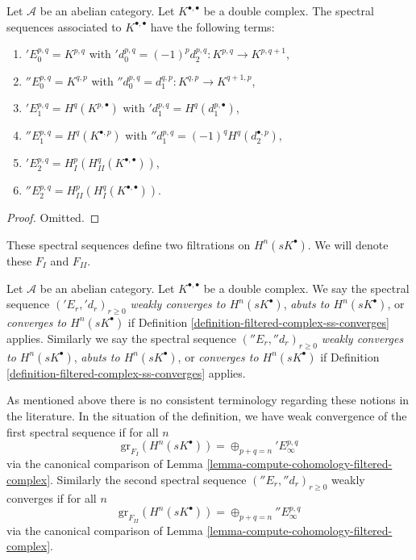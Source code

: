 \begin{lemma}
\label{lemma-ss-double-complex}
Let $\mathcal{A}$ be an abelian category.
Let $K^{\bullet, \bullet}$ be a double complex.
The spectral sequences associated to $K^{\bullet, \bullet}$
have the following terms:
\begin{enumerate}
\item ${}'E_0^{p, q} = K^{p, q}$ with
${}'d_0^{p, q} = (-1)^p d_2^{p, q} : K^{p, q} \to K^{p, q + 1}$,
\item ${}''E_0^{p, q} = K^{q, p}$ with
${}''d_0^{p, q} = d_1^{q, p} : K^{q, p} \to K^{q + 1, p}$,
\item ${}'E_1^{p, q} = H^q(K^{p, \bullet})$ with
${}'d_1^{p, q} = H^q(d_1^{p, \bullet})$,
\item ${}''E_1^{p, q} = H^q(K^{\bullet, p})$ with
${}''d_1^{p, q} = (-1)^q H^q(d_2^{\bullet, p})$,
\item ${}'E_2^{p, q} = H^p_I(H^q_{II}(K^{\bullet, \bullet}))$,
\item ${}''E_2^{p, q} = H^p_{II}(H^q_I(K^{\bullet, \bullet}))$.
\end{enumerate}
\end{lemma}

\begin{proof}
Omitted.
\end{proof}

\noindent
These spectral sequences define two filtrations on $H^n(sK^\bullet)$.
We will denote these $F_I$ and $F_{II}$.

\begin{definition}
\label{definition-ss-double-complex-converge}
Let $\mathcal{A}$ be an abelian category.
Let $K^{\bullet, \bullet}$ be a double complex.
We say the spectral sequence $({}'E_r, {}'d_r)_{r \geq 0}$
{\it weakly converges to $H^n(sK^\bullet)$},
{\it abuts to $H^n(sK^\bullet)$}, or
{\it converges to $H^n(sK^\bullet)$}
if Definition \ref{definition-filtered-complex-ss-converges} applies.
Similarly we say the spectral sequence $({}''E_r, {}''d_r)_{r \geq 0}$
{\it weakly converges to $H^n(sK^\bullet)$},
{\it abuts to $H^n(sK^\bullet)$}, or
{\it converges to $H^n(sK^\bullet)$}
if Definition \ref{definition-filtered-complex-ss-converges} applies.
\end{definition}

\noindent
As mentioned above there is no consistent terminology regarding these
notions in the literature. In the situation of the definition, we have
weak convergence of the first spectral sequence if for all $n$
$$
\text{gr}_{F_I}(H^n(sK^\bullet)) = \oplus_{p + q = n} {}'E_\infty^{p, q}
$$
via the canonical comparison of
Lemma \ref{lemma-compute-cohomology-filtered-complex}.
Similarly the second spectral sequence $({}''E_r, {}''d_r)_{r \geq 0}$
weakly converges if for all $n$
$$
\text{gr}_{F_{II}}(H^n(sK^\bullet)) = \oplus_{p + q = n} {}''E_\infty^{p, q}
$$
via the canonical comparison of
Lemma \ref{lemma-compute-cohomology-filtered-complex}.

